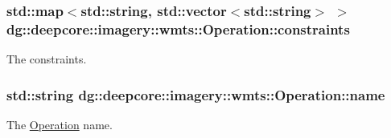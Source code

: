 \subsubsection[{\texorpdfstring{constraints}{constraints}}]{\setlength{\rightskip}{0pt plus 5cm}std\+::map$<$std\+::string, std\+::vector$<$std\+::string$>$ $>$ dg\+::deepcore\+::imagery\+::wmts\+::\+Operation\+::constraints}\hypertarget{structdg_1_1deepcore_1_1imagery_1_1wmts_1_1_operation_ab607d8f694296244e6a16f98ff4098f5}{}\label{structdg_1_1deepcore_1_1imagery_1_1wmts_1_1_operation_ab607d8f694296244e6a16f98ff4098f5}


The constraints. 

\subsubsection[{\texorpdfstring{name}{name}}]{\setlength{\rightskip}{0pt plus 5cm}std\+::string dg\+::deepcore\+::imagery\+::wmts\+::\+Operation\+::name}\hypertarget{structdg_1_1deepcore_1_1imagery_1_1wmts_1_1_operation_a8263a9299fabb3467f2a38baeba1b9b0}{}\label{structdg_1_1deepcore_1_1imagery_1_1wmts_1_1_operation_a8263a9299fabb3467f2a38baeba1b9b0}


The \hyperlink{structdg_1_1deepcore_1_1imagery_1_1wmts_1_1_operation}{Operation} name. 


